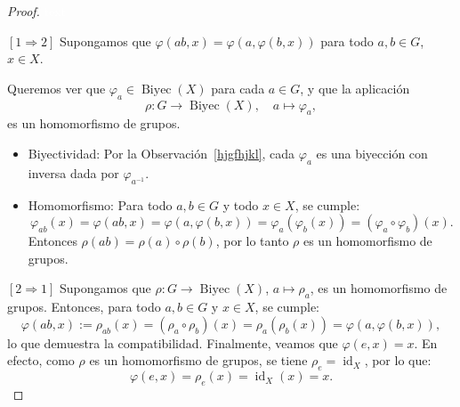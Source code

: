 \begin{proof}
	\textcolor{white}{text}
	
	\medskip
	\noindent
	\([1 \Rightarrow 2]\) Supongamos que \( \varphi(ab, x) = \varphi(a, \varphi(b,x)) \) para todo \( a,b \in G \), \( x \in X \).
	
	\medskip
	\noindent 
	Queremos ver que \( \varphi_a \in \operatorname{Biyec}(X) \) para cada \( a \in G \), y que la aplicación
	\[
	\rho : G \to \operatorname{Biyec}(X),\quad a \mapsto \varphi_a,
	\]
	es un homomorfismo de grupos.
	
	\begin{itemize}
		\item Biyectividad: Por la Observación~\ref{hjgfhjkl}, cada \( \varphi_a \) es una biyección con inversa dada por \( \varphi_{a^{-1}} \).
		
		\item Homomorfismo: Para todo \( a,b \in G \) y todo \( x \in X \), se cumple:
		\[
		\varphi_{ab}(x) = \varphi(ab, x) = \varphi(a, \varphi(b, x)) = \varphi_a(\varphi_b(x)) = (\varphi_a \circ \varphi_b)(x).
		\]
		Entonces \( \rho(ab) = \rho(a)\circ\rho(b) \), por lo tanto \( \rho \) es un homomorfismo de grupos.
	\end{itemize}
	
	\medskip
	
	\noindent\([2 \Rightarrow 1]\) Supongamos que \( \rho : G \to \operatorname{Biyec}(X) \), \( a \mapsto \rho_a \), es un homomorfismo de grupos. Entonces, para todo \( a,b \in G \) y \( x \in X \), se cumple:
	\[
	\varphi(ab, x) := \rho_{ab}(x) = (\rho_a \circ \rho_b)(x) = \rho_a(\rho_b(x)) = \varphi(a, \varphi(b, x)),
	\]
	lo que demuestra la compatibilidad. Finalmente, veamos que \( \varphi(e,x) = x \). En efecto, como \( \rho \) es un homomorfismo de grupos, se tiene \( \rho_e = \operatorname{id}_X \), por lo que:
	\[
	\varphi(e,x) = \rho_e(x) = \operatorname{id}_X(x) = x.
	\]
\end{proof}


\begin{observacion}
\end{observacion}
\vspace{0.5cm}

